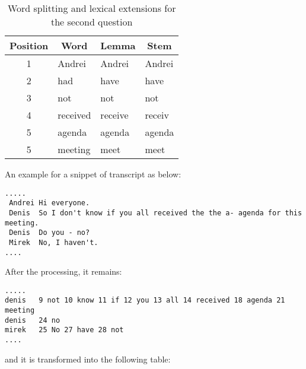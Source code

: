 \begin{table}[htbp]
\begin{center}
\scriptsize
\caption{Word splitting and lexical extensions for the second question}
\begin{tabular}{|c|l|l|l|}
\hline
\textbf{Position} & \multicolumn{1}{c|}{\textbf{Word}} & \multicolumn{1}{c|}{\textbf{Lemma}} & \multicolumn{1}{c|}{\textbf{Stem}} \\ \hline
1 & Andrei & Andrei & Andrei \\ \hline
2 & had & have & have \\ \hline
3 & not & not & not \\ \hline
4 & received & receive & receiv \\ \hline
5 & agenda & agenda & agenda \\ \hline
5 & meeting & meet & meet \\ \hline
\end{tabular}
\label{question2}
\end{center}
\end{table}

\normalsize



An example for a snippet of transcript as below:
\scriptsize
\begin{verbatim}
.....
 Andrei Hi everyone. 
 Denis  So I don't know if you all received the the a- agenda for this meeting.
 Denis 	Do you - no?
 Mirek 	No, I haven't.
....
\end{verbatim}
\normalsize

After the processing, it remains:
\scriptsize
\begin{verbatim}
.....
denis   9 not 10 know 11 if 12 you 13 all 14 received 18 agenda 21 meeting
denis   24 no 
mirek   25 No 27 have 28 not
....
\end{verbatim}
\normalsize

and it is transformed into the following table:

